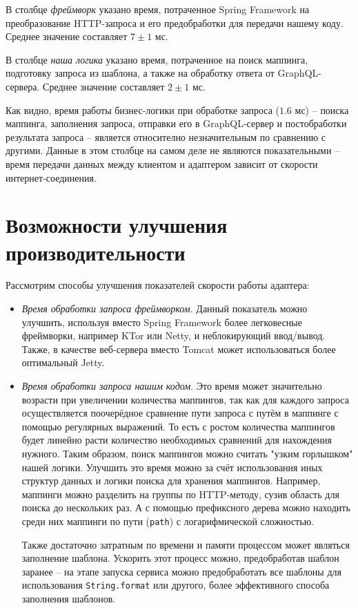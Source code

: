 В столбце \textit{фреймворк} указано время, потраченное Spring Framework на преобразование HTTP-запроса и его предобработки для передачи нашему коду.
Среднее значение составляет $7±1$ мс.

В столбце \textit{наша логика} указано время, потраченное на поиск маппинга, подготовку запроса из шаблона, а также на обработку ответа от GraphQL-сервера.
Среднее значение составляет $2±1$ мс.

Как видно, время работы бизнес-логики при обработке запроса ($1.6$ мс) -- поиска маппинга, заполнения запроса, отправки его в GraphQL-сервер и постобработки результата запроса -- является относително незначительным по сравнению с другими.
Данные в этом столбце на самом деле не являются показательными -- время передачи данных между клиентом и адаптером зависит от скорости интернет-соединения.


\section{Возможности улучшения производительности} \label{sec:ch4-performance-improve}

Рассмотрим способы улучшения показателей скорости работы адаптера:

\begin{itemize}
	\item \textit{Время обработки запроса фреймворком}.
		Данный показатель можно улучшить, используя вместо Spring Framework более легковесные фреймворки, например KTor или Netty, и неблокирующий ввод/вывод.
		Также, в качестве веб-сервера вместо Tomcat может использоваться более оптимальный Jetty.

	\item \textit{Время обработки запроса нашим кодом}.
		Это время может значительно возрасти при увеличении количества маппингов, так как для каждого запроса осуществляется поочерёдное сравнение пути запроса с путём в маппинге с помощью регулярных выражений.
То есть с ростом количества маппингов будет линейно расти количество необходимых сравнений для нахождения нужного.
Таким образом, поиск маппингов можно считать "узким горлышком" нашей логики.
Улучшить это время можно за счёт использования иных структур данных и логики поиска для хранения маппингов.
Например, маппинги можно разделить на группы по HTTP-методу, сузив область для поиска до нескольких раз.
А с помощью префиксного дерева можно находить среди них маппинги по пути (\texttt{path}) с логарифмической сложностью.

	Также достаточно затратным по времени и памяти процессом может являться заполнение шаблона.
	Ускорить этот процесс можно, предобработав шаблон заранее -- на этапе запуска сервиса можно предобработать все шаблоны для использования \texttt{String.format} или другого, более эффективного способа заполнения шаблонов.
\end{itemize}

